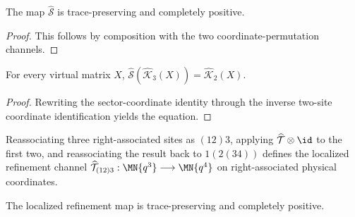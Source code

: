 \begin{lemma}
    \label{thm:mpdo_physical_s_map_cptp}
    \leanok
    The map $\widehat{\mathcal S}$ is trace-preserving and completely
    positive.
\end{lemma}

\begin{proof}\leanok
    This follows by composition with the two coordinate-permutation
    channels.
\end{proof}

\begin{lemma}
    \label{thm:mpdo_physical_s_closure_identity}
    \leanok
    For every virtual matrix $X$,
    $\widehat{\mathcal S}(\widehat{\mathcal K}_3(X))
        =\widehat{\mathcal K}_2(X)$.
\end{lemma}

\begin{proof}\leanok
    Rewriting the sector-coordinate identity through the inverse two-site
    coordinate identification yields the equation.
\end{proof}

\begin{definition}
    \label{def:mpdo_localized_physical_t_map}
    \leanok
    Reassociating three right-associated sites as $(12)3$, applying
    $\widehat{\mathcal T}\otimes\id$ to the first two, and
    reassociating the result back to $1(2(34))$ defines the localized
    refinement channel
    $\widehat{\mathcal T}_{(12)3}:\MN{q^3}\longrightarrow\MN{q^4}$
    on right-associated physical coordinates.
\end{definition}

\begin{lemma}
    \label{thm:mpdo_localized_physical_t_map_cptp}
    \leanok
    The localized refinement map is trace-preserving and completely
    positive.
\end{lemma}


